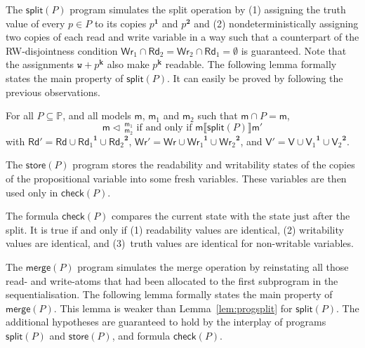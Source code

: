 \documentclass{llncs}
\newcommand{\progStore}{\mathsf{store}}
\newcommand{\progOkChange}{\mathsf{check}}
\newcommand{\progsplit}{\mathsf{split}}
\newcommand{\progmerge}{\mathsf{merge}}
\newcommand{\cp}[2]{{#2}^\mathbf{#1}}
\newcommand{\modl}{\mathsf m}
\newcommand{\splt}[3]{ #1 \triangleleft \, ^{#2}_{#3} }
\newcommand{\readset}{\mathsf{Rd}}
\newcommand{\valuset}{\mathsf{V}}
\newcommand{\writeset}{\mathsf{Wr}}
\newcommand{\assgntopW}[1]{{\mathtt w {+} #1}}
\newcommand{\intPgm}[1]{\llbracket #1 \rrbracket}
\newcommand{\propset}{\mathbb P}
\newcommand{\modinter}{\cap}
\begin{document}
The $\progsplit(P)$ program simulates the split operation by 
(1) assigning the truth value of every $p \in P$ to its copies $\cp 1 p$ and $\cp 2 p$ and
(2) nondeterministically assigning
two copies of each read and write variable in a way such that a counterpart of the RW-disjointness condition
$\writeset_1 \cap \readset_2 = \writeset_2 \cap \readset_1 = \emptyset$ is guaranteed.  
Note that the assignments $\assgntopW{ \cp{k}{p} }$ also make $\cp{k}{p} $ readable.
The following lemma formally states the main property of $\progsplit(P)$.
It can easily be proved by following the previous observations.

\begin{lemma}\label{lem:progsplit}
For all $P \subseteq \propset$, and all models $\modl$, $\modl_1$ and $\modl_2$ such that
$\modl \modinter P = \modl$,
$$ \splt \modl {\modl_1} {\modl_2} \text{ if and only if }
\modl \intPgm{\progsplit(P)} \modl'$$ with
$\readset' = \readset \cup \cp 1 {\readset_1} \cup \cp 2 {\readset_2}$,
$\writeset' = \writeset \cup \cp 1 {\writeset_1} \cup \cp 2 {\writeset_2}$, and
$\valuset' = \valuset \cup \cp 1 {\valuset_1} \cup \cp 2 {\valuset_2}$.
\end{lemma}

The $\progStore(P)$ program stores the readability and writability states of the
copies of the propositional variable into some fresh variables.
These variables are then used only in $\progOkChange(P)$.

The formula $\progOkChange(P)$ compares the current state with the state just after the split.
It is true if and only if
(1) readability values are identical, 
(2) writability values are identical, and
(3)~truth values are identical for non-writable variables.

The $\progmerge(P)$ program simulates the merge operation by reinstating all those 
read- and write-atoms that had been allocated to the first subprogram in the sequentialisation.
The following lemma formally states the main property of $\progmerge(P)$.
This lemma is weaker than Lemma~\ref{lem:progsplit} for $\progsplit(P)$.
The additional hypotheses are guaranteed to hold by the interplay of programs $\progsplit(P)$ and $\progStore(P)$,
and formula $\progOkChange(P)$.
\end{document}
